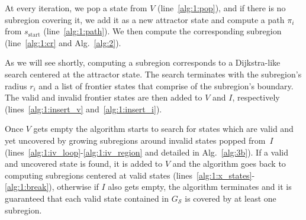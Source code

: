 \documentclass[letterpaper]{article} %
\newcommand{\calS}{\ensuremath{\mathcal{S}}\xspace}
\newcommand{\sStart}{\ensuremath{s_{\text{start}}\xspace}}
\begin{document}
At every iteration, we pop a state from $V$ (line~\ref{alg:1:pop}), and if there is no subregion covering it, we add it as a new attractor state and compute a path $\pi_i$ from $\sStart$ (line~\ref{alg:1:path}).
We then compute the corresponding subregion (line~\ref{alg:1:cr} and Alg.~\ref{alg:2}).

As we will see shortly, computing a subregion corresponds to a Dijkstra-like search centered at the attractor state.
The search terminates with the subregion's radius $r_i$ and a list of frontier states that comprise of the subregion's boundary.
The valid and invalid frontier states are then added to $V$ and $I$, respectively (lines~\ref{alg:1:insert_v} and~\ref{alg:1:insert_i}).


Once $V$ gets empty the algorithm starts to search for states which are valid and yet uncovered by growing subregions around invalid states popped from~$I$ (lines~\ref{alg:1:iv_loop}-\ref{alg:1:iv_region} and detailed in Alg.~\ref{alg:3b}). If a valid and uncovered state is found, it is added to $V$ and the algorithm goes back to computing subregions centered at valid states (lines~\ref{alg:1:x_states}-\ref{alg:1:break}), otherwise if $I$ also gets empty, the algorithm terminates and it is guaranteed that each valid state contained in $G_\calS$ is covered by at least one subregion.
\end{document}
